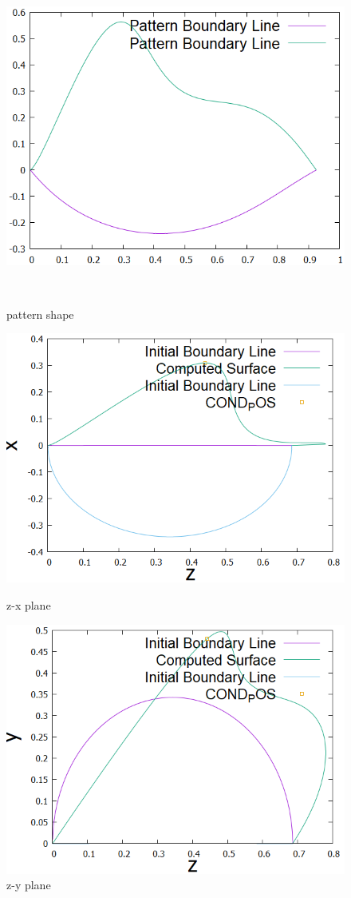 \documentclass[16.7pt]{jsarticle}
\begin{document}
　  	\begin{figure}[H]
　   		\centering
　   		\includegraphics[width = 0.4\columnwidth]{figure/0409/Patt2.png}
　   		\caption{pattern shape}
　   \end{figure}

	\begin{figure}[H]
		\begin{minipage}{0.5\hsize}
			\centering
			\includegraphics[width = 1.0\columnwidth]{figure/0415/ObtainedRidgeLinefromz-x.png}
			\caption{z-x plane }
		\end{minipage}
		\begin{minipage}{0.5\hsize}
			\centering
			\includegraphics[width = 1.0\columnwidth]{figure/0415/ObtainedRidgeLinefromz-y.png}
			\caption{z-y plane }
		\end{minipage}
	\end{figure}
\end{document}
